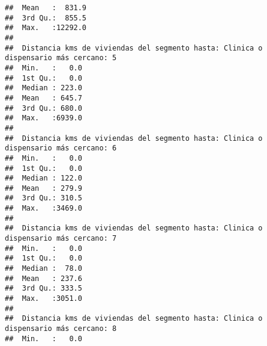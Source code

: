 \documentclass[11pt,]{article}
\begin{document}
\begin{verbatim}
##  Mean   :  831.9                                                                    
##  3rd Qu.:  855.5                                                                    
##  Max.   :12292.0                                                                    
##                                                                                     
##  Distancia kms de viviendas del segmento hasta: Clinica o dispensario más cercano: 5
##  Min.   :   0.0                                                                     
##  1st Qu.:   0.0                                                                     
##  Median : 223.0                                                                     
##  Mean   : 645.7                                                                     
##  3rd Qu.: 680.0                                                                     
##  Max.   :6939.0                                                                     
##                                                                                     
##  Distancia kms de viviendas del segmento hasta: Clinica o dispensario más cercano: 6
##  Min.   :   0.0                                                                     
##  1st Qu.:   0.0                                                                     
##  Median : 122.0                                                                     
##  Mean   : 279.9                                                                     
##  3rd Qu.: 310.5                                                                     
##  Max.   :3469.0                                                                     
##                                                                                     
##  Distancia kms de viviendas del segmento hasta: Clinica o dispensario más cercano: 7
##  Min.   :   0.0                                                                     
##  1st Qu.:   0.0                                                                     
##  Median :  78.0                                                                     
##  Mean   : 237.6                                                                     
##  3rd Qu.: 333.5                                                                     
##  Max.   :3051.0                                                                     
##                                                                                     
##  Distancia kms de viviendas del segmento hasta: Clinica o dispensario más cercano: 8
##  Min.   :   0.0                                                                     

\end{verbatim}
\end{document}
